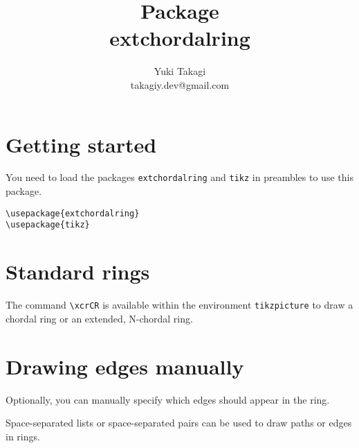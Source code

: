 \documentclass{article}
\title{\topskip0pt\vspace*{\fill}\biolinum\bfseries\large Package \\ \Huge extchordalring}
\author{Yuki Takagi \\ \normalsize takagiy.dev@gmail.com}
\date{\vspace*{\fill}}
\begin{document}
\begin{titlepage}
  \maketitle
  \begin{table*}[b!]
    \tableofcontents
  \end{table*}
  \thispagestyle{empty}
\end{titlepage}

\section{Getting started}

You need to load the packages \lstinline{extchordalring} and \lstinline{tikz}
in preambles to use this package.

\begin{lstlisting}
\usepackage{extchordalring}
\usepackage{tikz}
\end{lstlisting}

\section{Standard rings}

The command \lstinline{\xcrCR} is available within the environment \lstinline{tikzpicture}
to draw a chordal ring or an extended, N-chordal ring.

\begin{LTXexample}[pos=r]
\end{LTXexample}

\begin{LTXexample}[pos=r]
\end{LTXexample}

\section{Drawing edges manually}

Optionally, you can manually specify which edges should appear in the ring.

Space-separated lists or space-separated pairs can be used to draw paths or edges in rings.
\end{document}
